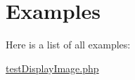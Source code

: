 \section{\-Examples}
\-Here is a list of all examples\-:\begin{DoxyCompactItemize}
\item 
\hyperlink{test_display_image_8php-example}{test\-Display\-Image.\-php}
\end{DoxyCompactItemize}
